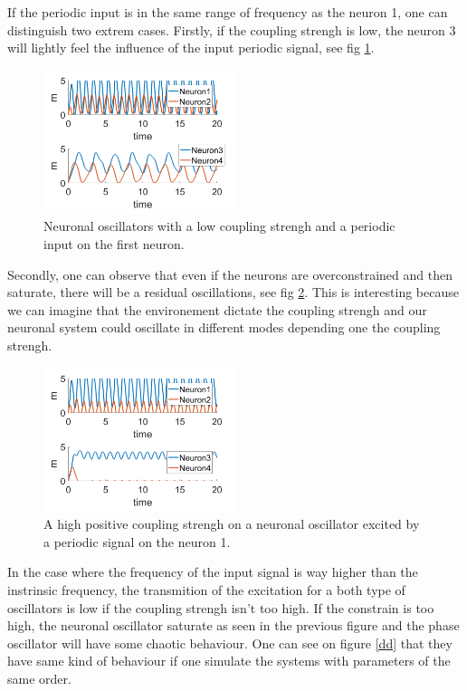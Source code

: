 \documentclass[a4paper]{scrartcl}
\begin{document}
If the periodic input is in the same range of frequency as the neuron 1, one can distinguish two extrem cases. Firstly, if the coupling strengh is low, the neuron 3 will lightly feel the influence of the input periodic signal, see fig \ref{7b}.

\begin{figure}[!h]
	\centering
	\includegraphics[width=0.5\textwidth]{fig/7b.png}
	\caption{Neuronal oscillators with a low coupling strengh and a periodic input on the first neuron.}\label{7b}
\end{figure}

Secondly, one can observe that even if the neurons are overconstrained and then saturate, there will be a residual oscillations, see fig \ref{sat}. This is interesting because we can imagine that the environement dictate the coupling strengh and our neuronal system could oscillate in different modes depending one the coupling strengh.

\begin{figure}[!h]
	\centering
	\includegraphics[width=0.5\textwidth]{fig/sat.png}
	\caption{A high positive coupling strengh on a neuronal oscillator excited by a periodic signal on the neuron 1.}\label{sat}
\end{figure}

\newpage

In the case where the frequency of the input signal is way higher than the instrinsic frequency, the transmition of the excitation for a both type of oscillators is low if the coupling strengh isn't too high. If the constrain is too high, the neuronal oscillator saturate as seen in the previous figure and the phase oscillator will have some chaotic behaviour. One can see on figure \ref{dd} that they have same kind of behaviour if one simulate the systems with parameters of the same order.
\end{document}

